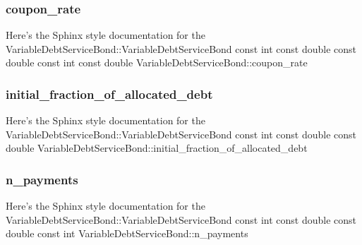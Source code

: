 \mbox{\label{classVariableDebtServiceBond_a4062feaf0e15546bbcf575aa8ec372e0}} 
\subsubsection{\texorpdfstring{coupon\+\_\+rate}{coupon\_rate}}
{\footnotesize\ttfamily Here’s the Sphinx style documentation for the Variable\+Debt\+Service\+Bond\+::\+Variable\+Debt\+Service\+Bond const int const double const double const int const double Variable\+Debt\+Service\+Bond\+::coupon\+\_\+rate}

\mbox{\label{classVariableDebtServiceBond_a23f451bb14e4898aaa585fbeae9667f9}} 
\subsubsection{\texorpdfstring{initial\+\_\+fraction\+\_\+of\+\_\+allocated\+\_\+debt}{initial\_fraction\_of\_allocated\_debt}}
{\footnotesize\ttfamily Here’s the Sphinx style documentation for the Variable\+Debt\+Service\+Bond\+::\+Variable\+Debt\+Service\+Bond const int const double const double Variable\+Debt\+Service\+Bond\+::initial\+\_\+fraction\+\_\+of\+\_\+allocated\+\_\+debt}

\mbox{\label{classVariableDebtServiceBond_ab4035559da3d8155d792612e628285ae}} 
\subsubsection{\texorpdfstring{n\+\_\+payments}{n\_payments}}
{\footnotesize\ttfamily Here’s the Sphinx style documentation for the Variable\+Debt\+Service\+Bond\+::\+Variable\+Debt\+Service\+Bond const int const double const double const int Variable\+Debt\+Service\+Bond\+::n\+\_\+payments}

